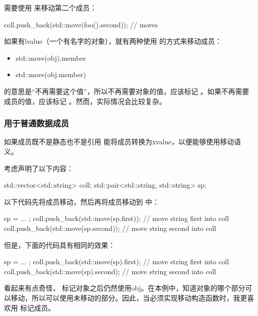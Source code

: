 需要使用  来移动第二个成员：

\begin{cppcode}
coll.push_back(std::move(foo().second)); // moves
\end{cppcode}

如果有lvalue（一个有名字的对象），就有两种使用  的方式来移动成员：

\begin{itemize}
	\item std::move(obj).member
	\item std::move(obj.member)
\end{itemize}

 的意思是“不再需要这个值”，所以不再需要对象的值，应该标记 。如果不再需要成员的值，应该标记 。然而，实际情况会比较复杂。

\subsubsection{ 用于普通数据成员}

如果成员既不是静态也不是引用  能将成员转换为xvalue，以便能够使用移动语义。

考虑声明了以下内容：

\begin{cppcode}
std::vector<std::string> coll;
std::pair<std::string, std::string> sp;
\end{cppcode}

以下代码先将成员移动，然后再将成员移动到  中：

\begin{cppcode}
sp = ... ;
coll.push_back(std::move(sp.first)); // move string first into coll
coll.push_back(std::move(sp.second)); // move string second into coll
\end{cppcode}

但是，下面的代码具有相同的效果：

\begin{cppcode}
sp = ... ;
coll.push_back(std::move(sp).first); // move string first into coll
coll.push_back(std::move(sp).second); // move string second into coll
\end{cppcode}

看起来有点奇怪， 标记对象之后仍然使用obj。在本例中，知道对象的哪个部分可以移动，所以可以使用未移动的部分。因此，当必须实现移动构造函数时，我更喜欢用  标记成员。

